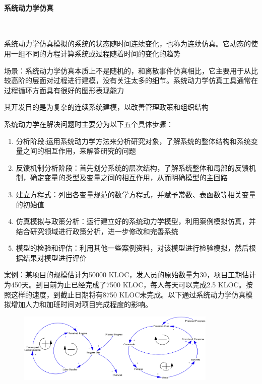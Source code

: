 \paragraph{系统动力学仿真}~{} \par
系统动力学仿真模拟的系统的状态随时间连续变化，也称为连续仿真。它动态的使用一组不同的方程计算系统或过程随着时间的变化的趋势

场景：系统动力学仿真本质上不是随机的，和离散事件仿真相比，它主要用于从比较高阶的层面对过程进行建模，没有关注太多的细节。系统动力学仿真工具通常在过程循环方面具有很好的图形表现能力

其开发目的是为复杂的连续系统建模，以改善管理政策和组织结构

系统动力学在解决问题时主要分为以下五个具体步骤：
\begin{enumerate}[label=\arabic*.]
    \item 分析阶段:运用系统动力学方法来分析研究对象，了解系统的整体结构和系统变量之间的相互作用，来解答研究的问题
    \item 反馈机制分析阶段：首先划分系统的层次结构，了解系统整体和局部的反馈机制，确定变量的类型及变量之间的相互作用，从而明确模型的主回路
    \item 建立方程式：列出各变量规范的数学方程式，并赋予常数、表函数等相关变量的初始值
    \item 仿真模拟与政策分析：运行建立好的系统动力学模型，利用案例模拟仿真，并结合研究领域进行政策分析，进一步修改和完善系统
    \item 模型的检验和评估：利用其他一些案例资料，对该模型进行检验模拟，然后根据结果对模型进行评价
\end{enumerate}

案例：某项目的规模估计为50000 KLOC，发人员的原始数量为30，项目工期估计为450天。到目前为止已经完成了7500 KLOC，每人每天可以完成2.5 KLOC。按照这样的速度，到截止日期将有8750 KLOC未完成。以下通过系统动力学仿真模拟增加人力和加班时间对项目完成程度的影响。
\begin{figure}[H]
    \vspace{-0.5em}
	\centering
	\includegraphics[width=0.85\textwidth]{images/系统动力学仿真示例.png}
    \vspace{-1em}
\end{figure}

